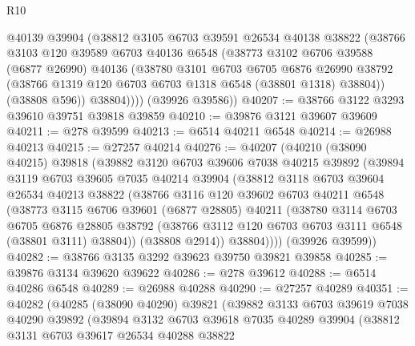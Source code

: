 \begin{lexlean}{R10}
\begin{coremodule}
          @40139
          @39904
          (@38812
            @3105
            @6703
            @39591
            @26534
            @40138
            @38822
            (@38766
              @3103
              @120
              @39589
              @6703
              @40136
              @6548
              (@38773
                @3102
                @6706
                @39588
                (@6877 @26990)
                @40136
                (@38780
                  @3101
                  @6703
                  @6705
                  @6876
                  @26990
                  @38792
                  (@38766 @1319 @120 @6703 @6703 @1318 @6548 (@38801 @1318) @38804))
                (@38808 @596))
              @38804))))
      (@39926 @39586))
@40207 := @38766 @3122 @3293 @39610 @39751 @39818 @39859
@40210 := @39876 @3121 @39607 @39609
@40211 := @278 @39599
@40213 := @6514 @40211 @6548
@40214 := @26988 @40213
@40215 := @27257 @40214
@40276 := @40207
    (@40210
      (@38090 @40215)
      @39818
      (@39882
        @3120
        @6703
        @39606
        @7038
        @40215
        @39892
        (@39894
          @3119
          @6703
          @39605
          @7035
          @40214
          @39904
          (@38812
            @3118
            @6703
            @39604
            @26534
            @40213
            @38822
            (@38766
              @3116
              @120
              @39602
              @6703
              @40211
              @6548
              (@38773
                @3115
                @6706
                @39601
                (@6877 @28805)
                @40211
                (@38780
                  @3114
                  @6703
                  @6705
                  @6876
                  @28805
                  @38792
                  (@38766 @3112 @120 @6703 @6703 @3111 @6548 (@38801 @3111) @38804))
                (@38808 @2914))
              @38804))))
      (@39926 @39599))
@40282 := @38766 @3135 @3292 @39623 @39750 @39821 @39858
@40285 := @39876 @3134 @39620 @39622
@40286 := @278 @39612
@40288 := @6514 @40286 @6548
@40289 := @26988 @40288
@40290 := @27257 @40289
@40351 := @40282
    (@40285
      (@38090 @40290)
      @39821
      (@39882
        @3133
        @6703
        @39619
        @7038
        @40290
        @39892
        (@39894
          @3132
          @6703
          @39618
          @7035
          @40289
          @39904
          (@38812
            @3131
            @6703
            @39617
            @26534
            @40288
            @38822

\end{coremodule}
\end{lexlean}
